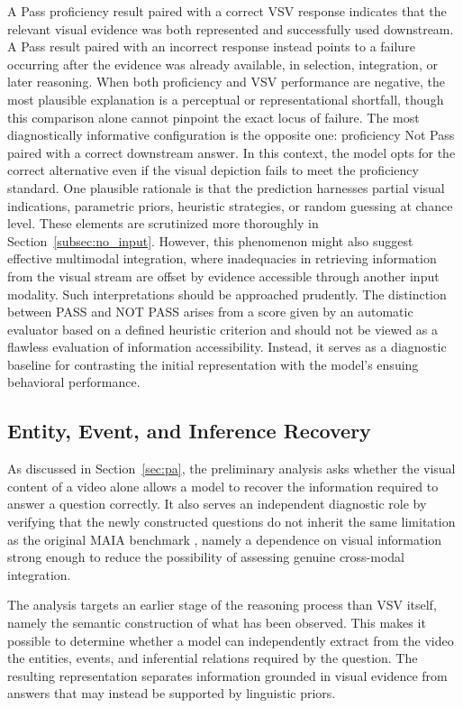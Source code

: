 A Pass proficiency result paired with a correct VSV response indicates that the relevant visual evidence was both represented and successfully used downstream. A Pass result paired with an incorrect response instead points to a failure occurring after the evidence was already available, in selection, integration, or later reasoning. When both proficiency and VSV performance are negative, the most plausible explanation is a perceptual or representational shortfall, though this comparison alone cannot pinpoint the exact locus of failure.
The most diagnostically informative configuration is the opposite one: proficiency Not Pass paired with a correct downstream answer. In this context, the model opts for the correct alternative even if the visual depiction fails to meet the proficiency standard. One plausible rationale is that the prediction harnesses partial visual indications, parametric priors, heuristic strategies, or random guessing at chance level. These elements are scrutinized more thoroughly in Section~\ref{subsec:no_input}. However, this phenomenon might also suggest effective multimodal integration, where inadequacies in retrieving information from the visual stream are offset by evidence accessible through another input modality. Such interpretations should be approached prudently. The distinction between PASS and NOT PASS arises from a score given by an automatic evaluator based on a defined heuristic criterion and should not be viewed as a flawless evaluation of information accessibility. Instead, it serves as a diagnostic baseline for contrasting the initial representation with the model's ensuing behavioral performance.
\subsection*{Entity, Event, and Inference Recovery}
\label{subsec:entity_event_inference}

As discussed in Section~\ref{sec:pa}, the preliminary analysis asks whether the visual content of a video alone allows a model to recover the information required to answer a question correctly. It also serves an independent diagnostic role by verifying that the newly constructed questions do not inherit the same limitation as the original MAIA benchmark \cite{testa2025maia}, namely a dependence on visual information strong enough to reduce the possibility of assessing genuine cross-modal integration.

The analysis targets an earlier stage of the reasoning process than VSV itself, namely the semantic construction of what has been observed. This makes it possible to determine whether a model can independently extract from the video the entities, events, and inferential relations required by the question. The resulting representation separates information grounded in visual evidence from answers that may instead be supported by linguistic priors.

